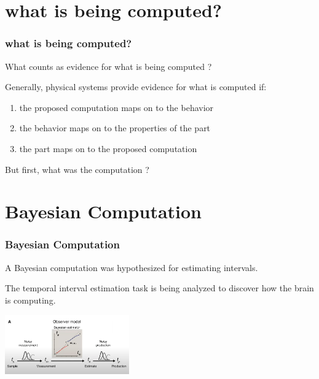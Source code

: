 \documentclass{beamer}
\begin{document}
\section{what is being computed?}
\begin{frame}
\frametitle{\textbf{what is being computed?} }
What counts as evidence for what is being computed ?

Generally, physical systems provide evidence for what is computed if:

\begin{enumerate}
    \item the proposed computation maps on to the behavior
    \item the behavior maps on to the properties of the part
    \item the part maps on to the proposed computation
\end{enumerate}

But first, what was the computation ?


\end{frame}


\section{Bayesian Computation}
\begin{frame}
\frametitle{\textbf{Bayesian Computation} }
A Bayesian computation was hypothesized for estimating intervals.


The temporal interval estimation task is being analyzed to discover how the brain is computing.

\centering
\begin{minipage}{1\textwidth}
    \centering
    \includegraphics[width=0.4\textwidth]{images/Sohn_et_al-2019_02.PNG} %
\end{minipage}

\end{frame}
\end{document}
